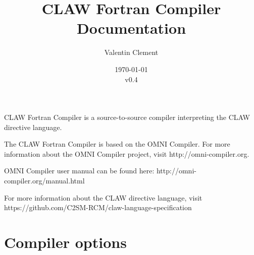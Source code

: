 \documentclass{article}
\title{CLAW Fortran Compiler Documentation}
\author{Valentin Clement}
\date{\today\\\vspace{1em}v0.4}
\begin{document}
\maketitle

CLAW Fortran Compiler is a source-to-source compiler interpreting the CLAW
directive language.

The CLAW Fortran Compiler is based on the OMNI Compiler. For more information
about the OMNI Compiler project, visit http://omni-compiler.org.

OMNI Compiler user manual can be found here: http://omni-compiler.org/manual.html

For more information about the CLAW directive language, visit
https://github.com/C2SM-RCM/claw-language-specification


\section{Compiler options}
\end{document}
